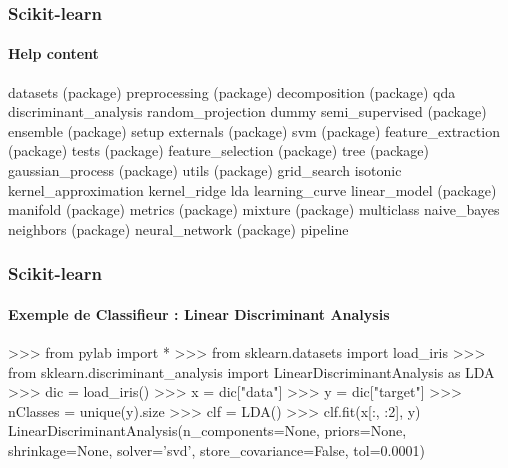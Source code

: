 \begin{frame}[fragile]
\frametitle{Scikit-learn}
\framesubtitle{Help content}                                                                  
\begin{pythonConsole}
    datasets (package)                       preprocessing (package)   
    decomposition (package)                  qda                       
    discriminant_analysis                    random_projection         
    dummy                                    semi_supervised (package) 
    ensemble (package)                       setup                     
    externals (package)                      svm (package)             
    feature_extraction (package)             tests (package)           
    feature_selection (package)              tree (package)            
    gaussian_process (package)               utils (package)           
    grid_search                              
    isotonic                                 
    kernel_approximation                     
    kernel_ridge                             
    lda                                      
    learning_curve                           
    linear_model (package)                   
    manifold (package)                       
    metrics (package)                        
    mixture (package)                        
    multiclass                               
    naive_bayes                              
    neighbors (package)                      
    neural_network (package)                 
    pipeline
\end{pythonConsole}
\end{frame}
\begin{frame}[fragile]
\frametitle{Scikit-learn}
\framesubtitle{Exemple de Classifieur : Linear Discriminant Analysis}
\begin{pythonConsole}
>>> from pylab import *
>>> from sklearn.datasets import load_iris
>>> from sklearn.discriminant_analysis import LinearDiscriminantAnalysis as LDA
>>> dic = load_iris()
>>> x = dic["data"]
>>> y = dic["target"]
>>> nClasses = unique(y).size
>>> clf = LDA()
>>> clf.fit(x[:, :2], y)
LinearDiscriminantAnalysis(n_components=None, priors=None, shrinkage=None,
              solver='svd', store_covariance=False, tol=0.0001)
\end{pythonConsole}
\end{frame}
